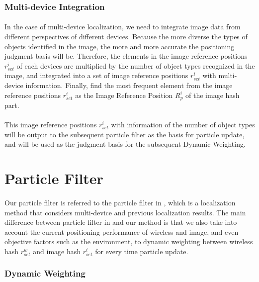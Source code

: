\documentclass[a4paper,12pt]{report}
\begin{document}
\subsubsection{Multi-device Integration}
\paragraph{}
In the case of multi-device localization, we need to integrate image data from different perspectives of different devices. Because the more diverse the types of objects identified in the image, the more and more accurate the positioning judgment basis will be. Therefore, the elements in the image reference positions $r_{set}^{i}$ of each devices are multiplied by the number of object types recognized in the image, and integrated into a set of image reference positions $r_{set}^{i}$ with multi-device information. Finally, find the most frequent element from the image reference positions $r_{set}^{i}$ as the Image Reference Position $R_p^{i}$ of the image hash part. 

\paragraph{}
This image reference positions $r_{set}^{i}$ with information of the number of object types will be output to the subsequent particle filter as the basis for particle update, and will be used as the judgment basis for the subsequent Dynamic Weighting.

\section{Particle Filter}

\paragraph{}
Our particle filter is referred to the particle filter in \cite{Sou2022JoLo, Lin2021}, which is a localization method that considers multi-device and previous localization results. The main difference between particle filter in \cite{Lin2021} and our method is that we also take into account the current positioning performance of wireless and image, and even objective factors such as the environment, to dynamic weighting between wireless hash $r_{set}^{w}$ and image hash $r_{set}^{i}$  for every time particle update.

\subsubsection{Dynamic Weighting}
\end{document}
